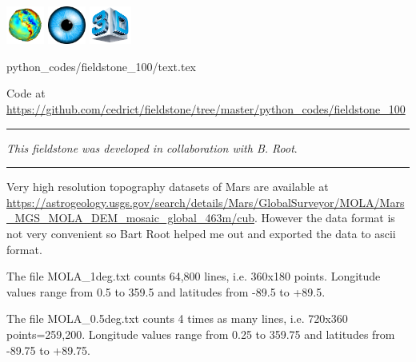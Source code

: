 \includegraphics[height=1.25cm]{images/pictograms/gravity}
\includegraphics[height=1.25cm]{images/pictograms/visualisation}
\includegraphics[height=1.25cm]{images/pictograms/3d}


\begin{flushright} {\tiny {\color{gray} python\_codes/fieldstone\_100/text.tex}} \end{flushright}

%

\begin{center}
Code at \url{https://github.com/cedrict/fieldstone/tree/master/python_codes/fieldstone_100}
\end{center}

\par\noindent\rule{\textwidth}{0.4pt}

{\sl This fieldstone was developed in collaboration with B. Root}. 

\par\noindent\rule{\textwidth}{0.4pt}

Very high resolution topography datasets of Mars are available at 
\url{https://astrogeology.usgs.gov/search/details/Mars/GlobalSurveyor/MOLA/Mars_MGS_MOLA_DEM_mosaic_global_463m/cub}.
However the data format is not very convenient so Bart Root 
helped me out and exported the data to ascii format.

The file {\filenamefont MOLA\_1deg.txt} counts 64,800 lines, 
i.e. 360x180 points. Longitude values range from  
0.5 to 359.5 and latitudes from -89.5 to +89.5. 

The file {\filenamefont MOLA\_0.5deg.txt} counts 4 times as many lines, 
i.e. 720x360 points=259,200. Longitude values range from  
0.25 to 359.75 and latitudes from -89.75 to +89.75. 

